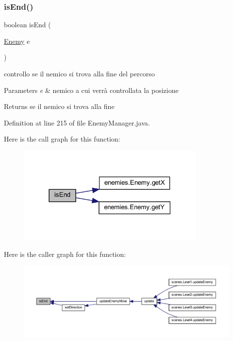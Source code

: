 \subsubsection{\texorpdfstring{is\+End()}{isEnd()}}
{\footnotesize\ttfamily boolean is\+End (\begin{DoxyParamCaption}\item[{\hyperlink{classenemies_1_1_enemy}{Enemy}}]{e }\end{DoxyParamCaption})\hspace{0.3cm}{\ttfamily [private]}}



controllo se il nemico si trova alla fine del percorso 


\begin{DoxyParams}{Parameters}
{\em e} & nemico a cui verrà controllata la posizione\\
\hline
\end{DoxyParams}
\begin{DoxyReturn}{Returns}
se il nemico si trova alla fine 
\end{DoxyReturn}


Definition at line 215 of file Enemy\+Manager.\+java.

Here is the call graph for this function\+:\nopagebreak
\begin{figure}[H]
\begin{center}
\leavevmode
\includegraphics[width=267pt]{classmanagers_1_1_enemy_manager_afec98871c0e021759b9d0afc8b690a18_cgraph}
\end{center}
\end{figure}
Here is the caller graph for this function\+:\nopagebreak
\begin{figure}[H]
\begin{center}
\leavevmode
\includegraphics[width=350pt]{classmanagers_1_1_enemy_manager_afec98871c0e021759b9d0afc8b690a18_icgraph}
\end{center}
\end{figure}
\mbox{\label{classmanagers_1_1_enemy_manager_a774aefe7ec0626eb37d65a2335eade3b}} 
